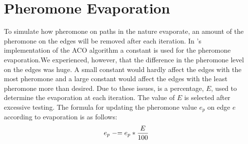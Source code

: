 \section{Pheromone Evaporation}
\label{sec:evaporation}
To simulate how pheromone on paths in the nature evaporate, an amount of the pheromone on the edges will be removed after each iteration. In \citet{nanda11}'s implementation of the ACO algorithm a constant is used for the pheromone evaporation.We experienced, however, that the difference in the pheromone level on the edges was huge. A small constant would hardly affect the edges with the most pheromone and a large constant would affect the edges with the least pheromone more than desired. Due to these issues, is a percentage, $E$, used to determine the evaporation at each iteration. The value of $E$ is selected after excessive testing.
The formula for updating the pheromone value $e_p$ on edge $e$ according to evaporation is as follows: 
\newline
$$e_p \mathrel{-}= e_p*\frac{E}{100}$$
\newline


